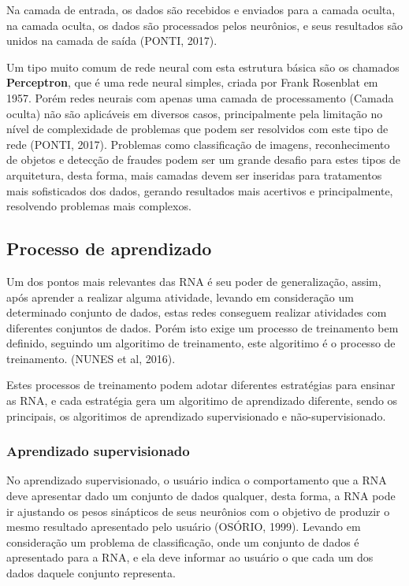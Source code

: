 Na camada de entrada, os dados são recebidos e enviados para a camada oculta, na camada oculta, os dados são processados pelos neurônios, e seus resultados são unidos na camada de saída (PONTI, 2017).

Um tipo muito comum de rede neural com esta estrutura básica são os chamados \textbf{Perceptron}, que é uma rede neural simples, criada por Frank Rosenblat em 1957. Porém redes neurais com apenas uma camada de processamento (Camada oculta) não são aplicáveis em diversos casos, principalmente pela limitação no nível de complexidade de problemas que podem ser resolvidos com este tipo de rede (PONTI, 2017). Problemas como classificação de imagens, reconhecimento de objetos e detecção de fraudes podem ser um grande desafio para estes tipos de arquitetura, desta forma, mais camadas devem ser inseridas para tratamentos mais sofisticados dos dados, gerando resultados mais acertivos e principalmente, resolvendo problemas mais complexos. 

\subsection{Processo de aprendizado}

Um dos pontos mais relevantes das RNA é seu poder de generalização, assim, após aprender a realizar alguma atividade, levando em consideração um determinado conjunto de dados, estas redes conseguem realizar atividades com diferentes conjuntos de dados. Porém isto exige um processo de treinamento bem definido, seguindo um algoritimo de treinamento, este algoritimo é o processo de treinamento. (NUNES et al, 2016).

Estes processos de treinamento podem adotar diferentes estratégias para ensinar as RNA, e cada estratégia gera um algoritimo de aprendizado diferente, sendo os principais, os algoritimos de aprendizado supervisionado e não-supervisionado.

\subsubsection{Aprendizado supervisionado}

No aprendizado supervisionado, o usuário indica o comportamento que a RNA deve apresentar dado um conjunto de dados qualquer, desta forma, a RNA pode ir ajustando os pesos sinápticos de seus neurônios com o objetivo de produzir o mesmo resultado apresentado pelo usuário (OSÓRIO, 1999). Levando em consideração um problema de classificação, onde um conjunto de dados é apresentado para a RNA, e ela deve informar ao usuário o que cada um dos dados daquele conjunto representa.

